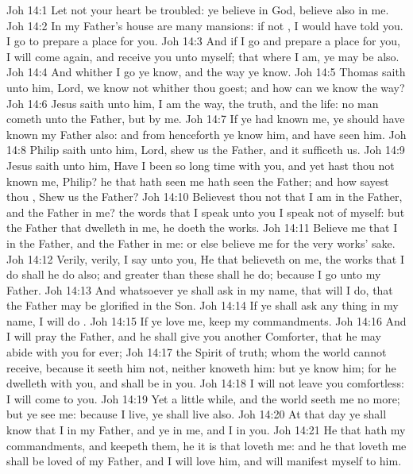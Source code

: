\vs Joh 14:1 Let not your heart be troubled: ye believe in God, believe also in me.
\vs Joh 14:2 In my Father's house are many mansions: if  not , I would have told you. I go to prepare a place for you.
\vs Joh 14:3 And if I go and prepare a place for you, I will come again, and receive you unto myself; that where I am,  ye may be also.
\vs Joh 14:4 And whither I go ye know, and the way ye know.
\vs Joh 14:5 Thomas saith unto him, Lord, we know not whither thou goest; and how can we know the way?
\vs Joh 14:6 Jesus saith unto him, I am the way, the truth, and the life: no man cometh unto the Father, but by me.
\vs Joh 14:7 If ye had known me, ye should have known my Father also: and from henceforth ye know him, and have seen him.
\vs Joh 14:8 Philip saith unto him, Lord, shew us the Father, and it sufficeth us.
\vs Joh 14:9 Jesus saith unto him, Have I been so long time with you, and yet hast thou not known me, Philip? he that hath seen me hath seen the Father; and how sayest thou , Shew us the Father?
\vs Joh 14:10 Believest thou not that I am in the Father, and the Father in me? the words that I speak unto you I speak not of myself: but the Father that dwelleth in me, he doeth the works.
\vs Joh 14:11 Believe me that I  in the Father, and the Father in me: or else believe me for the very works' sake.
\vs Joh 14:12 Verily, verily, I say unto you, He that believeth on me, the works that I do shall he do also; and greater  than these shall he do; because I go unto my Father.
\vs Joh 14:13 And whatsoever ye shall ask in my name, that will I do, that the Father may be glorified in the Son.
\vs Joh 14:14 If ye shall ask any thing in my name, I will do .
\vs Joh 14:15 If ye love me, keep my commandments.
\vs Joh 14:16 And I will pray the Father, and he shall give you another Comforter, that he may abide with you for ever;
\vs Joh 14:17  the Spirit of truth; whom the world cannot receive, because it seeth him not, neither knoweth him: but ye know him; for he dwelleth with you, and shall be in you.
\vs Joh 14:18 I will not leave you comfortless: I will come to you.
\vs Joh 14:19 Yet a little while, and the world seeth me no more; but ye see me: because I live, ye shall live also.
\vs Joh 14:20 At that day ye shall know that I  in my Father, and ye in me, and I in you.
\vs Joh 14:21 He that hath my commandments, and keepeth them, he it is that loveth me: and he that loveth me shall be loved of my Father, and I will love him, and will manifest myself to him.
